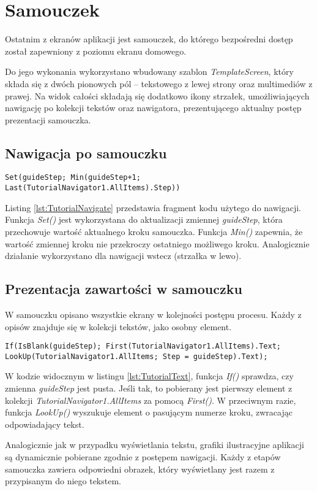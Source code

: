 \section{Samouczek}

Ostatnim z ekranów aplikacji jest samouczek, do którego bezpośredni dostęp został zapewniony z poziomu ekranu domowego.

Do jego wykonania wykorzystano wbudowany szablon \emph{TemplateScreen}, który składa się z dwóch pionowych pól -- tekstowego z lewej strony oraz multimediów z prawej. Na widok całości składają się dodatkowo ikony strzałek, umożliwiających nawigację po kolekcji tekstów oraz nawigatora, prezentującego aktualny postęp prezentacji samouczka.

\subsection{Nawigacja po samouczku}

\begin{lstlisting}[language=PowerFx]
Set(guideStep; Min(guideStep+1; Last(TutorialNavigator1.AllItems).Step))
\end{lstlisting}

Listing \ref{lst:TutorialNavigate} przedstawia fragment kodu użytego do nawigacji. Funkcja \emph{Set()} jest wykorzystana do aktualizacji zmiennej \emph{guideStep}, która przechowuje wartość aktualnego kroku samouczka. Funkcja \emph{Min()} zapewnia, że wartość zmiennej kroku nie przekroczy ostatniego możliwego kroku.  Analogicznie działanie wykorzystano dla nawigacji wstecz (strzałka w lewo).

\subsection{Prezentacja zawartości w samouczku}

W samouczku opisano wszystkie ekrany w kolejności postępu procesu. Każdy z opisów znajduje się w kolekcji tekstów, jako osobny element.

\begin{lstlisting}[language=PowerFx]
If(IsBlank(guideStep); First(TutorialNavigator1.AllItems).Text; LookUp(TutorialNavigator1.AllItems; Step = guideStep).Text);
\end{lstlisting}

W kodzie widocznym w listingu \ref{lst:TutorialText}, funkcja \emph{If()} sprawdza, czy zmienna \emph{guideStep} jest pusta. Jeśli tak, to pobierany jest pierwszy element z kolekcji \emph{TutorialNavigator1.AllItems} za pomocą \emph{First()}. W przeciwnym razie, funkcja \emph{LookUp()} wyszukuje element o pasującym numerze kroku, zwracając odpowiadający tekst.

Analogicznie jak w przypadku wyświetlania tekstu, grafiki ilustracyjne aplikacji są dynamicznie pobierane zgodnie z postępem nawigacji. Każdy z etapów samouczka zawiera odpowiedni obrazek, który wyświetlany jest razem z przypisanym do niego tekstem.